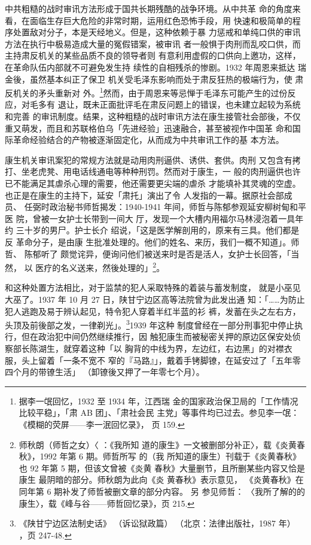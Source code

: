 中共粗糙的战时审讯方法形成于国共长期残酷的战争环境。从中共革 命的角度来
看，在面临生存巨大危险的非常时期，运用红色恐怖手段，用 快速和极简单的程
序处置敌对分子，本是天经地义。但是，这种依赖于暴 力惩戒和单纯口供的审讯
方法在执行中极易造成大量的冤假错案，被审讯 者一般惧于肉刑而乱咬口供，而
主持肃反机关的某些品质不良的领导者则 有意利用虚假的口供向上邀功，这样，
在革命队伍内部就不可避免发生持 续性的自相残杀的惨剧。1932 年周恩来抵达
瑞金後，虽然基本纠正了保卫 机关受毛泽东影响而处于肃反狂热的极端行为，使
肃反机关的矛头重新对 外。\footnote{据李一氓回忆，1932 至 1934 年，江西瑞
金的国家政治保卫局的「工作情况比较平稳」，「肃 AB 团」、「肃社会民
主党」等事件均已过去。参见李一氓：
《模糊的荧屏——李一泯回忆录》，
页 159.}然而，由于周恩来等忌惮于毛泽东可能产生的过份反应，对毛多有
退让，既未正面批评毛在肃反问题上的错误，也未建立起较为系统和完善
的审讯制度。结果，这种粗糙的战时审讯方法在康生接管社会部後，不仅
重又萌发，而且和苏联格伯乌「先进经验」迅速融合，甚至被视作中国革
命和国际革命经验结合的产物被逐渐固定化，从而成为中共审讯工作的基
本方法。
 
康生机关审讯案犯的常规方法就是动用肉刑逼供、诱供、套供。肉刑 又包含有拷
打、坐老虎凳、用电话线通电等种种刑罚。然而对于康生，一 般的肉刑逼供也许
已不能满足其虐杀心理的需要，他还需要更尖端的虐杀 才能填补其灵魂的空虚。
也正是在康生的主持下，延安「肃托」演出了令 人发指的一幕。据原社会部成员、
任弼时政治秘书师哲揭发：1940-1941 年间，师哲与陈郁参观延安柳树甸和平医
院，曾被一女护士长带到一间大 厅，发现一个大槽内用福尔马林浸泡着一具年约
三十岁的男尸。护士长介 绍说，「这是医学解剖用的，原来有三具。他们都是反
革命分子，是由康 生批准处理的。他们的姓名、来历，我们一概不知道」。师哲、
陈郁听了 颇觉诧异，便询问他们被送来时是否是活人，女护士长回答，「当然，
以 医疗的名义送来，然後处理的」\footnote{师秋朗（师哲之女）〈 ：《我所知
道的康生》一文被删部分补正〉，载《炎黄春秋》，1992 年第 6 期。师哲所写
的（我 所知道的康生）刊载于《炎黄春秋》也 92 年第 5 期，但该文曾被《炎黄
春秋》大量删节，且所删某些内容又恰是康生 最阴暗的部分。师秋朗为此向《炎
黄春秋》表示意见， 《炎黄春秋》在同年第 6 期补发了师哲被删文章的部分内容。
另 参见师哲： 〈我所了解的的康生〉，载《峰与谷——师哲回忆录》，页 215.
}。

和这种处置方法相比，对于监禁的犯人采取特殊的着装与蓄发制度，
就是小巫见大巫了。1937 年 10 月 27 日，陕甘宁边区高等法院曾为此发出通
知：「……为防止犯人逃跑及易于辨认起见，特令犯人穿着半红半蓝的衫
裤，发蓄在头之左右方，头顶及前後部之发，一律剃光」。\footnote{《陕甘宁边区法制史话》
（诉讼狱政篇）
（北京：法律出版社，1987 年）
，页 247-48.}1939 年这种
制度曾经在一部分刑事犯中停止执行，但在政治犯中间仍然继续推行，因
触犯康生而被秘密关押的原边区保安处侦察部长陈湖生，就穿着这种「以
胸背的中线为界，左边红，右边黑」的对襟衣服，头上留着「一条不宽不
窄的『马路』」，戴着手铐脚镣，在延安过了「五年零四个月的带镣生活」
（卸镣後又押了一年零七个月）。

